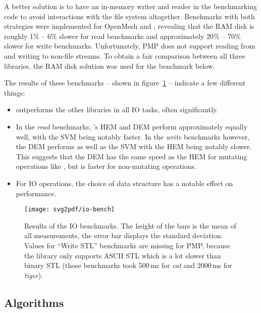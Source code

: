 A better solution is to have an in-memory writer and reader in the benchmarking code to avoid interactions with the file system altogether.
Benchmarks with both strategies were implemented for OpenMesh and , revealing that the RAM disk is roughly 1\% -- 6\% slower for read benchmarks and approximately 20\% -- 70\% slower for write benchmarks.
Unfortunately, PMP does not support reading from and writing to non-file streams.
To obtain a fair comparison between all three libraries, the RAM disk solution was used for the benchmark below.

\vfill

The results of these benchmarks -- shown in figure~\ref{fig:io-benchmark} -- indicate a few different things:

\begin{itemize}
  \item {} outperforms the other libraries in all IO tasks, often significantly.
  \item In the \emph{read} benchmarks, 's HEM and DEM perform approximately equally well, with the SVM being notably faster.
  In the \emph{write} benchmarks however, the DEM performs as well as the SVM with the HEM being notably slower.
  This suggests that the DEM has the same speed as the HEM for mutating operations like , but is faster for non-mutating operations.
  \item For IO operations, the choice of data structure has a notable effect on performance.
\end{itemize}

\begin{figure}[p]
  \centering
  \centerline{
    \texttt{[image: svg2pdf/io-bench]}
  }
  \vspace{1cm}
  \caption{
    Results of the IO benchmarks.
    The height of the bars is the mean of all measurements, the error bar displays the standard deviation.
    Values for \enquote{Write STL} benchmarks are missing for PMP, because the library only supports ASCII STL which is a lot slower than binary STL (those benchmarks took 500\,ms for \emph{cat} and 2000\,ms for \emph{tiger}).
  }
  \label{fig:io-benchmark}
\end{figure}

\newpage

\subsection{Algorithms}

